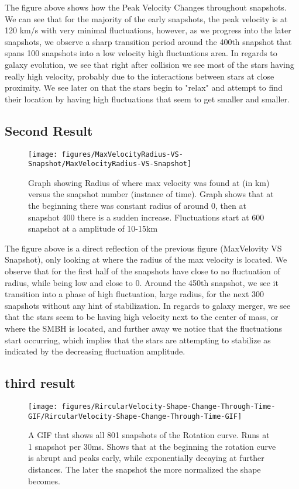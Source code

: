 \documentclass[modern]{aastex61}
\begin{document}
The figure above shows how the Peak Velocity Changes throughout snapshots. We can see that for the majority of the early snapshots, the peak velocity is at 120 km/s with very minimal fluctuations, however, as we progress into the later snapshots, we observe a sharp transition period around the 400th snapshot that spans 100 snapshots into a low velocity high fluctuations area. In regards to galaxy evolution, we see that right after collision we see most of the stars having really high velocity, probably due to the interactions between stars at close proximity. We see later on that the stars begin to "relax" and attempt to find their location by having high fluctuations that seem to get smaller and smaller.


\subsection{Second Result}
\begin{figure}[h!]
\begin{center}
\texttt{[image: figures/MaxVelocityRadius-VS-Snapshot/MaxVelocityRadius-VS-Snapshot]}
\caption{{Graph showing Radius of where max velocity was found at (in km) versus
the snapshot number (instance of time). Graph shows that at the
beginning there was constant radius of around 0, then at snapshot 400
there is a sudden increase. Fluctuations start at 600 snapshot at a
amplitude of 10-15km
{\label{432315}}%
}}
\end{center}
\end{figure}

The figure above is a direct reflection of the previous figure (MaxVelovity VS Snapshot), only looking at where the radius of the max velocity is located. We observe that for the first half of the snapshots have close to no fluctuation of radius, while being low and close to 0. Around the 450th snapshot, we see it transition into a phase of high fluctuation, large radius, for the next 300 snapshots without any hint of stabilization. In regards to galaxy merger, we see that the stars seem to be having high velocity next to the center of mass, or where the SMBH is located, and further away we notice that the fluctuations start occurring, which implies that the stars are attempting to stabilize as indicated by the decreasing fluctuation amplitude.

\subsection{third result}
\begin{figure}[h!]
\begin{center}
\texttt{[image: figures/RircularVelocity-Shape-Change-Through-Time-GIF/RircularVelocity-Shape-Change-Through-Time-GIF]}
\caption{{A GIF that shows all 801 snapshots of the Rotation curve. Runs at 1
snapshot per 30ms. Shows that at the beginning the rotation curve is
abrupt and peaks early, while exponentially decaying at further
distances. The later the snapshot the more normalized the shape
becomes.~
{\label{649469}}%
}}
\end{center}
\end{figure}
\end{document}
